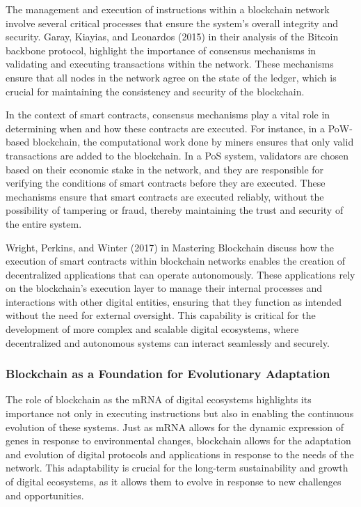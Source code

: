 \documentclass[12pt,twoside]{article}
\begin{document}
The management and execution of instructions within a blockchain network involve several critical processes that ensure the system’s overall integrity and security. Garay, Kiayias, and Leonardos (2015) in their analysis of the Bitcoin backbone protocol, highlight the importance of consensus mechanisms in validating and executing transactions within the network. These mechanisms ensure that all nodes in the network agree on the state of the ledger, which is crucial for maintaining the consistency and security of the blockchain.

In the context of smart contracts, consensus mechanisms play a vital role in determining when and how these contracts are executed. For instance, in a PoW-based blockchain, the computational work done by miners ensures that only valid transactions are added to the blockchain. In a PoS system, validators are chosen based on their economic stake in the network, and they are responsible for verifying the conditions of smart contracts before they are executed. These mechanisms ensure that smart contracts are executed reliably, without the possibility of tampering or fraud, thereby maintaining the trust and security of the entire system.

Wright, Perkins, and Winter (2017) in Mastering Blockchain discuss how the execution of smart contracts within blockchain networks enables the creation of decentralized applications that can operate autonomously. These applications rely on the blockchain’s execution layer to manage their internal processes and interactions with other digital entities, ensuring that they function as intended without the need for external oversight. This capability is critical for the development of more complex and scalable digital ecosystems, where decentralized and autonomous systems can interact seamlessly and securely.

\subsubsection{Blockchain as a Foundation for Evolutionary Adaptation}

The role of blockchain as the mRNA of digital ecosystems highlights its importance not only in executing instructions but also in enabling the continuous evolution of these systems. Just as mRNA allows for the dynamic expression of genes in response to environmental changes, blockchain allows for the adaptation and evolution of digital protocols and applications in response to the needs of the network. This adaptability is crucial for the long-term sustainability and growth of digital ecosystems, as it allows them to evolve in response to new challenges and opportunities.
\end{document}
